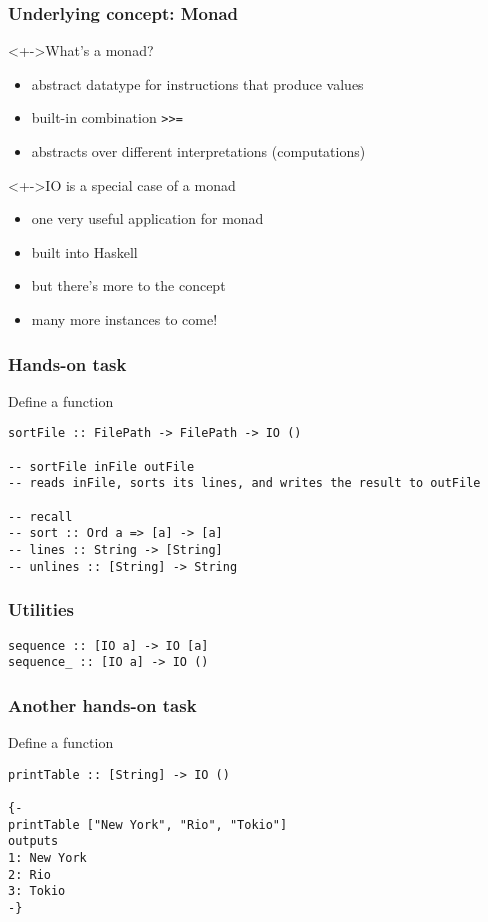 \documentclass{beamer}
\begin{document}
\begin{frame}
  \frametitle{Underlying concept: \textbf{Monad}}

  \begin{block}<+->{What's a monad?}
    \begin{itemize}
    \item abstract datatype for instructions that produce values
    \item built-in combination \texttt{>>=}
    \item abstracts over different interpretations (computations)
    \end{itemize}
  \end{block}
  \begin{alertblock}<+->{IO is a special case of a monad}
    \begin{itemize}
    \item one very useful application for monad
    \item built into Haskell
    \item but there's more to the concept
    \item many more instances to come!
    \end{itemize}
  \end{alertblock}
\end{frame}
\begin{frame}[fragile]
  \frametitle{Hands-on task}
  Define a function
\begin{verbatim}
sortFile :: FilePath -> FilePath -> IO ()

-- sortFile inFile outFile 
-- reads inFile, sorts its lines, and writes the result to outFile

-- recall
-- sort :: Ord a => [a] -> [a]
-- lines :: String -> [String]
-- unlines :: [String] -> String
\end{verbatim}
\end{frame}
\begin{frame}[fragile]
  \frametitle{Utilities}
\begin{verbatim}
sequence :: [IO a] -> IO [a]
sequence_ :: [IO a] -> IO ()
\end{verbatim}
\end{frame}
\begin{frame}[fragile]
  \frametitle{Another hands-on task}
  Define a function
\begin{verbatim}
printTable :: [String] -> IO ()

{-
printTable ["New York", "Rio", "Tokio"]
outputs
1: New York
2: Rio
3: Tokio
-} 
\end{verbatim}
\end{frame}
\end{document}
